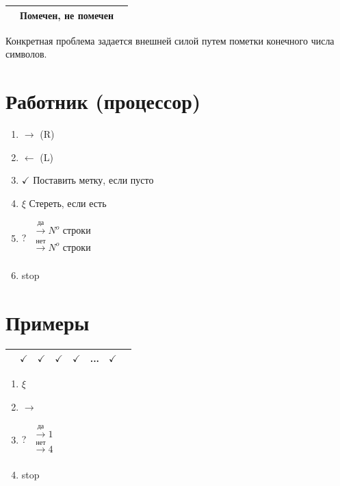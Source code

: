 \documentclass[a4paper, 14pt]{report}
\begin{document}
\hfill

\begin{tabular}{c|c|c}
    \hline
    & Помечен, не помечен & \\
    \hline
\end{tabular}

\hfill

Конкретная проблема задается внешней силой путем пометки конечного числа символов.

\section{Работник (процессор)}

\begin{enumerate}
    \item $\to$  (R)
    \item $\leftarrow$ (L)
    \item $\checkmark$ Поставить метку, если пусто
    \item $\xi$ Стереть, если есть
    \item ? $\begin{matrix}
            \overset{\text{да}}{\to} N^o \text{ строки} \\
            \overset{\text{нет}}{\to} N^o \text{ строки} \\
            \end{matrix}$
    \item stop
\end{enumerate}

\section{Примеры}

\begin{tabular}{c|c|c|c|c|c|c|c}
    \hline
    & $\checkmark$ & $\checkmark$ & $\checkmark$ & $\checkmark$ & ... & $\checkmark$ &  \\
    \hline
\end{tabular}

\begin{enumerate}
    \item $\xi$
    \item $\to$
    \item ? $\begin{matrix}
            \overset{\text{да}}{\to} 1 \\
            \overset{\text{нет}}{\to} 4 \\
            \end{matrix}$
    \item stop
\end{enumerate}
\end{document}
